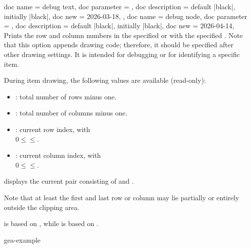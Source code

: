 \documentclass[a4paper,11pt]{article}
\begin{document}
\clearpage
\begin{docGeaKeys}
  {
    {
      doc name        = debug text,
      doc parameter   = {},
      doc description = {default |black|, initially |black|},
      doc new         = 2026-03-18,
    },
    {
      doc name        = debug node,
      doc parameter   = {},
      doc description = {default |black|, initially |black|},
      doc new         = 2026-04-14,
    }
  }
  Prints the row and column numbers in the specified 
  or with the specified . Note that this
  option appends drawing code; therefore, it should be specified after other
  drawing settings. It is intended for debugging or for identifying a specific
  item.\par
  During item drawing, the following values are available (read-only):
  \begin{itemize}
  \item {}: total number of rows minus one.
  \item {}: total number of columns minus one.
  \item {}: current row index, with\\
  $0\le$$\le$.
  \item {}: current column index, with\\
  $0\le$$\le$.
  \end{itemize}
   displays the current pair consisting of
   and .\par
  Note that at least the first and last row or column may lie partially or entirely
  outside the clipping area.\par
   is based on ,
  while
   is based on .
\begin{dispExample*}{gea-example}
\end{dispExample*}
\end{docGeaKeys}
\end{document}
